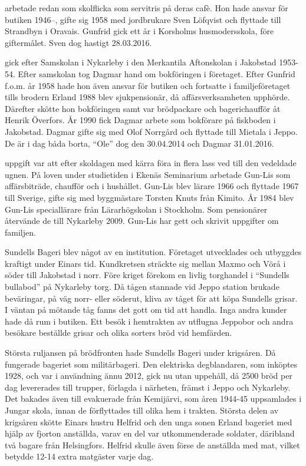  arbetade redan som skolflicka som servitris på deras cafè. Hon hade ansvar för butiken 1946--, gifte sig 1958 med jordbrukare Sven Löfqvist och flyttade till Strandbyn i Oravais. Gunfrid gick ett år i Korsholms husmodersskola, före giftermålet. Sven dog hastigt 28.03.2016.

 gick efter Samskolan i Nykarleby i den Merkantila Aftonskolan i Jakobstad 1953-54. Efter samskolan tog Dagmar hand om bokföringen i företaget. Efter Gunfrid f.o.m. år 1958 hade hon även ansvar för butiken och fortsatte i familjeföretaget tills brodern Erland 1988 blev sjukpensionär, då affärsverksamheten upphörde. Därefter skötte hon bokföringen samt var brödpackare och bagerichaufför åt Henrik Överfors. År 1990 fick Dagmar arbete som bokförare på fiskboden i Jakobstad. Dagmar gifte sig med Olof Norrgård och flyttade till Mietala i Jeppo. De är i dag båda borta, ``Ole'' dog den 30.04.2014 och Dagmar 31.01.2016.

 uppgift var att efter skoldagen med kärra föra in flera lass ved till den vedeldade ugnen. På loven under studietiden i Ekenäs Seminarium arbetade Gun-Lis som affärsbiträde, chaufför och i hushållet. Gun-Lis blev lärare 1966 och flyttade 1967 till Sverige, gifte sig  med byggmästare Torsten Knuts från Kimito. År 1984 blev Gun-Lis speciallärare från Lärarhögskolan i Stockholm. Som pensionärer återvände de till Nykarleby 2009. Gun-Lis har gett och skrivit uppgifter om familjen.

Sundells Bageri blev något av en institution. Företaget utvecklades och utbyggdes kraftigt under Einars tid. Kundkretsen sträckte sig mellan Maxmo och Vörå i söder till Jakobstad i norr. Före kriget förekom en livlig torghandel i ``Sundells bullabod'' på Nykarleby torg. Då tågen stannade vid Jeppo station brukade beväringar, på väg norr- eller  söderut, kliva av tåget för att köpa Sundells grisar. I väntan på mötande tåg fanns det gott om tid att handla. Inga andra kunder hade då rum i butiken. Ett besök i hemtrakten av utflugna Jeppobor och andra besökare beställde grisar och olika sorters bröd vid hemfärden.

Största ruljansen på brödfronten hade Sundells Bageri under krigsåren. Då fungerade bageriet som militärbageri. Den elektriska degblandaren, som inköptes 1928, och var i användning ännu 2012, gick nu utan uppehåll, då 2500 bröd per dag levererades till trupper, förlagda i närheten, främst i Jeppo och Nykarleby. Det bakades även till evakuerade från Kemijärvi, som åren 1944-45 uppsamlades i Jungar skola, innan de förflyttades till olika hem i trakten. Största delen av krigsåren skötte Einars hustru Helfrid och den unga sonen Erland bageriet med hjälp av fjorton anställda, varav en del var utkommenderade soldater, däribland två bagare från Helsingfors. Helfrid skulle även förse de anställda med mat, vilket betydde 12-14 extra matgäster varje dag.

